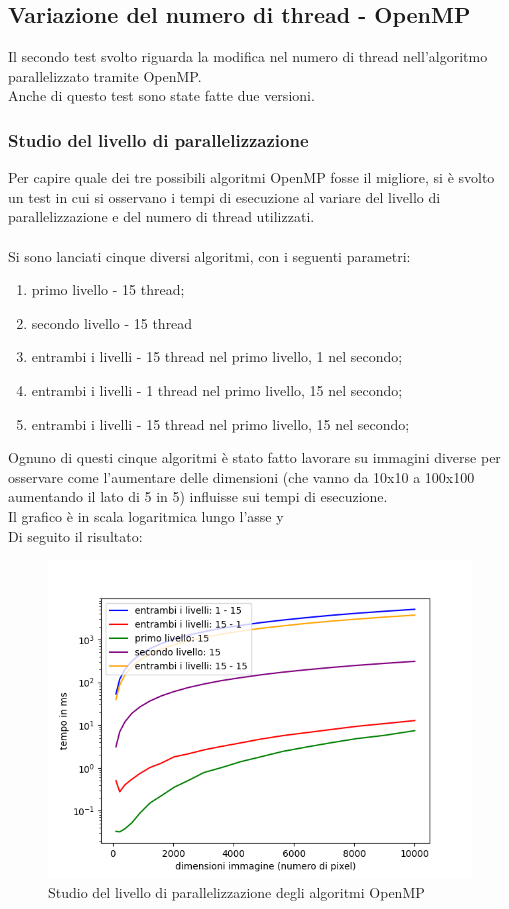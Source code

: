 \documentclass[10pt,twocolumn,letterpaper]{article}
\begin{document}
\subsection{Variazione del numero di thread - OpenMP}
Il secondo test svolto riguarda la modifica nel numero di thread nell'algoritmo parallelizzato tramite OpenMP.\\
Anche di questo test sono state fatte due versioni.

\subsubsection{Studio del livello di parallelizzazione}
Per capire quale dei tre possibili algoritmi OpenMP fosse il migliore, si è svolto un test in cui si osservano i tempi di esecuzione al variare del livello di parallelizzazione e del numero di thread utilizzati.\\
\\
Si sono lanciati cinque diversi algoritmi, con i seguenti parametri:
\begin{enumerate}
\item{primo livello - 15 thread;}
\item{secondo livello - 15 thread}
\item{entrambi i livelli - 15 thread nel primo livello, 1 nel secondo;}
\item{entrambi i livelli - 1 thread nel primo livello, 15 nel secondo;}
\item{entrambi i livelli - 15 thread nel primo livello, 15 nel secondo;}
\end{enumerate}
Ognuno di questi cinque algoritmi è stato fatto lavorare su immagini diverse per osservare come l'aumentare delle dimensioni (che vanno da 10x10 a 100x100 aumentando il lato di 5 in 5) influisse sui tempi di esecuzione.\\
Il grafico è in scala logaritmica lungo l'asse y\\
Di seguito il risultato:
\begin{figure}[H]
\includegraphics[width=1.1\linewidth]{test/threadsTest/levelsTest/result.png} 
\caption{\small Studio del livello di parallelizzazione degli algoritmi OpenMP}
\label{omp1}
\end{figure}
\end{document}
